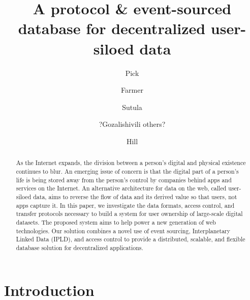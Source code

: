 \documentclass{textile}
\begin{document}
\pagecolor{white}

\title[Textile Threads Draft]{A protocol \& event-sourced database for decentralized user-siloed data}
\author{Pick}
\author{Farmer}
\author{Sutula}
 
\author{?Gozalishivili others?}
 
\author{Hill}
 






\begin{abstract}
As the Internet expands, the division between a person's digital and physical existence continues to blur. An emerging issue of concern is that the digital part of a person's life is being stored away from the person's control by companies behind apps and services on the Internet. An alternative architecture for data on the web, called user-siloed data, aims to reverse the flow of data and its derived value so that users, not apps capture it. In this paper, we investigate the data formats, access control, and transfer protocols necessary to build a system for user ownership of large-scale digital datasets. The proposed system aims to help power a new generation of web technologies. Our solution combines a novel use of event sourcing, Interplanetary Linked Data (IPLD), and access control to provide a distributed, scalable, and flexible database solution for decentralized applications.
\end{abstract}

\maketitle

\section{Introduction}
\end{document}
